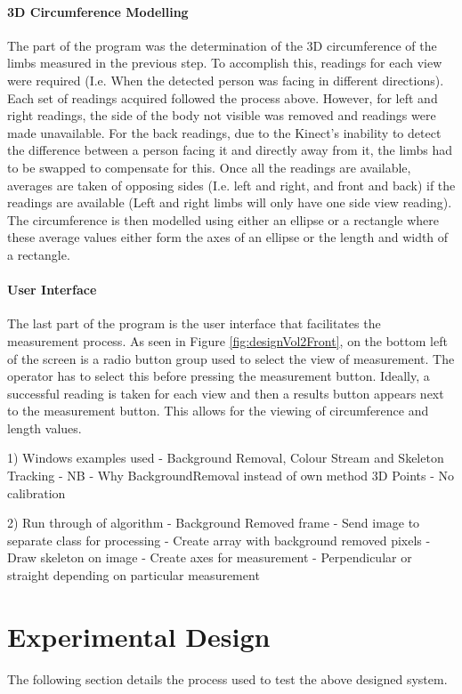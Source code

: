 \paragraph{3D Circumference Modelling}
The part of the program was the determination of the 3D circumference of the limbs measured in the previous step. To accomplish this, readings for each view were required (I.e. When the detected person was facing in different directions). Each set of readings acquired followed the process above. However, for left and right readings, the side of the body not visible was removed and readings were made unavailable. For the back readings, due to the Kinect's inability to detect the difference between a person facing it and directly away from it, the limbs had to be swapped to compensate for this. Once all the readings are available, averages are taken of opposing sides (I.e. left and right, and front and back) if the readings are available (Left and right limbs will only have one side view reading). The circumference is then modelled using either an ellipse or a rectangle where these average values either form the axes of an ellipse or the length and width of a rectangle. 

\paragraph{User Interface}
The last part of the program is the user interface that facilitates the measurement process. As seen in Figure \ref{fig:designVol2Front}, on the bottom left of the screen is a radio button group used to select the view of measurement. The operator has to select this before pressing the measurement button. Ideally, a successful reading is taken for each view and then a results button appears next to the measurement button. This allows for the viewing of circumference and length values.


1) Windows examples used - Background Removal, Colour Stream and Skeleton Tracking - NB - Why BackgroundRemoval instead of own method
3D Points - No calibration

2) Run through of algorithm
- Background Removed frame
- Send image to separate class for processing
- Create array with background removed pixels
- Draw skeleton on image
- Create axes for measurement - Perpendicular or straight depending on particular measurement

\section{Experimental Design}
The following section details the process used to test the above designed system.

